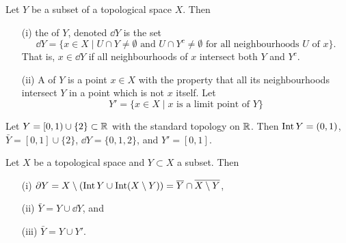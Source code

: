 \begin{defn}
  Let $Y$ be a subset of a topological space $X$. Then
  \begin{enumerate}
    \item[(i)] the  of $Y$, denoted $\dd Y$ is the set
      \[
        \dd Y = \{ x \in X \mid \text{$U \cap Y \not= \emptyset$ and $U \cap Y^c \not= \emptyset$ for all neighbourhoods $U$ of $x$}\}.
      \]
      That is, $x \in \dd Y$ if all neighbourhoods of $x$ intersect both $Y$ and $Y^c$.
    \item[(ii)] A  of $Y$ is a point $x \in X$ with the property that all its neighbourhoods intersect $Y$ in a point which is not $x$ itself. Let
    \[
      Y' = \{x \in X \mid \text{$x$ is a limit point of $Y$} \}
    \]
  \end{enumerate}
\end{defn}
\begin{example}
  Let $Y = [0,1) \cup \{2\} \subset \mathbb{R}$ with the standard topology on $\mathbb{R}$. Then $\operatorname{Int} Y = (0,1)$, $\bar{Y} = [0,1] \cup \{2\}$, $\dd Y = \{0,1,2\}$, and $Y' = [0,1]$.
\end{example}
\begin{thm}
  \label{relations-closure-boundary}
  Let $X$ be a topological space and $Y \subset X$ a subset. Then
  \begin{enumerate}
    \item[(i)]  $\partial Y = X \setminus (\operatorname{Int} Y \cup \operatorname{Int} (X \setminus Y)) = \overline Y \cap \overline{X \setminus Y}$,
    \item[(ii)] $\bar{Y} = Y \cup \dd Y$, and
    \item[(iii)] $\bar{Y} = Y \cup Y'$.
  \end{enumerate}
\end{thm}
